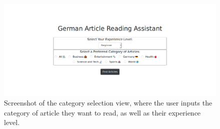 \begin{figure}[H]
	\caption[Screenshot of the Category Selection View]{Screenshot of the category selection view, where the user inputs the category of article they want to read, as well as their experience level.}
	\label{fig:view1}
	\begin{center}
	\includegraphics[width=\textwidth]{Graphics/View1}
	\end{center}
\end{figure}